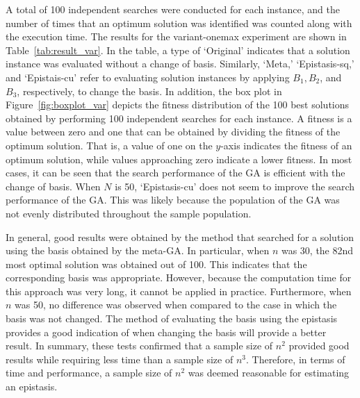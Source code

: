A total of 100 independent searches were conducted for each instance, and the number of times that an optimum solution was identified was counted along with the execution time. The results for the variant-onemax experiment are shown in Table~\ref{tab:result_var}. In the table, a type of `Original' indicates that a solution instance was evaluated without a change of basis. Similarly, `Meta,' `Epistasis-sq,' and `Epistais-cu' refer to evaluating solution instances by applying $ B_1,B_2 $, and $ B_3 $, respectively, to change the basis. In addition, the box plot in Figure~\ref{fig:boxplot_var} depicts the fitness distribution of the 100 best solutions obtained by performing 100 independent searches for each instance. A fitness is a value between zero and one that can be obtained by dividing the fitness of the optimum solution. That is, a value of one on the $ y $-axis indicates the fitness of an optimum solution, while values approaching zero indicate a lower fitness. In most cases, it can be seen that the search performance of the GA is efficient with the change of basis. When $ N $ is 50, `Epistasis-cu' does not seem to improve the search performance of the GA. This was likely because the population of the GA was not evenly distributed throughout the sample population.

In general, good results were obtained by the method that searched for a solution using the basis obtained by the meta-GA. In particular, when $ n $ was 30, the 82nd most optimal solution was obtained out of 100. This indicates that the corresponding basis was appropriate. However, because the computation time for this approach was very long, it cannot be applied in practice. Furthermore, when $ n $ was 50, no difference was observed when compared to the case in which the basis was not changed. The method of evaluating the basis using the epistasis provides a good indication of when changing the basis will provide a better result. In summary, these tests confirmed that a sample size of $ n^2 $ provided good results while requiring less time than a sample size of $ n^3 $. Therefore, in terms of time and performance, a sample size of $ n^2 $ was deemed reasonable for estimating an epistasis.


